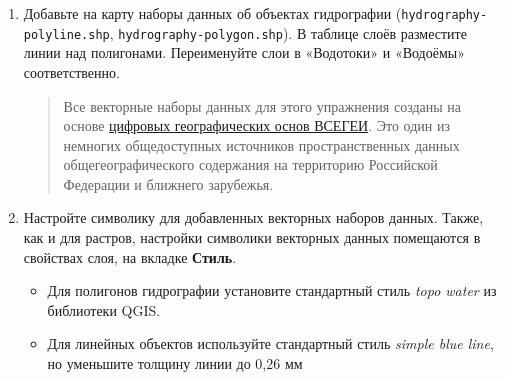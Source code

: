 \documentclass[
  12pt,
]{book}
\providecommand{\tightlist}{%
  \setlength{\itemsep}{0pt}\setlength{\parskip}{0pt}}
\begin{document}
\begin{enumerate}
\def\labelenumi{\arabic{enumi}.}
\item
  Добавьте на карту наборы данных об объектах гидрографии (\texttt{hydrography-polyline.shp}, \texttt{hydrography-polygon.shp}). В таблице слоёв разместите линии над полигонами. Переименуйте слои в «Водотоки» и «Водоёмы» соответственно.

  \begin{quote}
  Все векторные наборы данных для этого упражнения созданы на основе \href{http://www.vsegei.com/ru/info/topo/}{цифровых географических основ ВСЕГЕИ}. Это один из немногих общедоступных источников пространственных данных общегеографического содержания на территорию Российской Федерации и ближнего зарубежья.
  \end{quote}
\item
  Настройте символику для добавленных векторных наборов данных. Также, как и для растров, настройки символики векторных данных помещаются в свойствах слоя, на вкладке \textbf{Стиль}.

  \begin{itemize}
  \tightlist
  \item
    Для полигонов гидрографии установите стандартный стиль \emph{topo water} из библиотеки QGIS.\\
  \item
    Для линейных объектов используйте стандартный стиль \emph{simple blue line}, но уменьшите толщину линии до 0,26 мм
  \end{itemize}


\end{enumerate}
\end{document}

